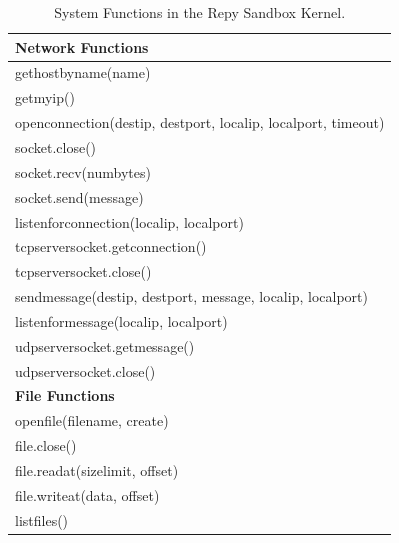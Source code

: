 \begin{table}
\caption {System Functions in the Repy Sandbox Kernel.  }
\begin{tabular}{|l|}
  \hline
  \textbf{Network Functions} \\
  \hline
  gethostbyname(name) \\
  \hline
  getmyip() \\
  \hline
  openconnection(destip, destport, localip, localport, timeout) \\
  \hline
  socket.close() \\
  \hline
  socket.recv(numbytes) \\
  \hline
  socket.send(message) \\
  \hline
  listenforconnection(localip, localport) \\
  \hline
  tcpserversocket.getconnection() \\
  \hline
  tcpserversocket.close()\\
  \hline
  sendmessage(destip, destport, message, localip, localport) \\
  \hline
  listenformessage(localip, localport) \\
  \hline
  udpserversocket.getmessage() \\
  \hline
  udpserversocket.close() \\
  \hline \hline
  \textbf{File Functions} \\
  \hline
  openfile(filename, create) \\
  \hline
  file.close() \\
  \hline
  file.readat(sizelimit, offset) \\
  \hline
  file.writeat(data, offset) \\
  \hline
  listfiles() \\

\end{tabular}
\end{table}
